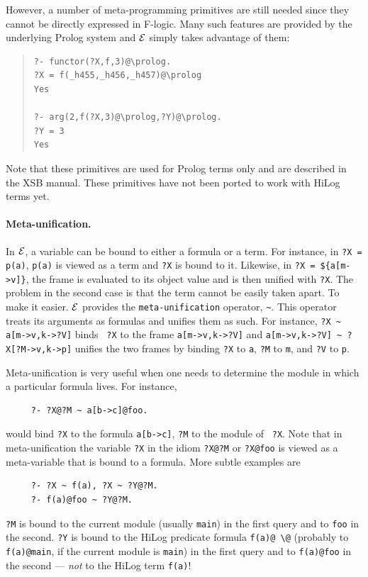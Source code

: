 \documentclass[11pt]{article}
\newcommand{\ERGO}{\mbox{\ensuremath{\cal{E}}\smaller{{\sc{RGO}}}}\xspace}
\newcommand{\FLSYSTEM}{\ERGO}
\newcommand{\bs}{\textbackslash}
\newcommand{\fl}{\mbox{F-logic}\xspace}
\begin{document}
However, a number of meta-programming primitives are still needed
since they cannot be directly expressed in \fl. Many such features are
provided by the underlying Prolog system and \FLSYSTEM simply takes advantage of
them: 
\begin{quote}
\begin{verbatim}
?- functor(?X,f,3)@\prolog.
?X = f(_h455,_h456,_h457)@\prolog
Yes

?- arg(2,f(?X,3)@\prolog,?Y)@\prolog.
?Y = 3
Yes
\end{verbatim}
\end{quote}
Note that these primitives are used for Prolog terms only and
are described in the XSB manual. These primitives have not been ported to
work with HiLog terms yet.

\paragraph{Meta-unification.}
In \FLSYSTEM, a variable can be bound to either a formula or a term. For instance,
in {\tt ?X = p(a)}, {\tt p(a)} is viewed as a term and {\tt ?X} is bound to
it. Likewise, in {\tt ?X = \$\{a[m->v]\}}, the frame is evaluated to its
object value and is then unified with {\tt ?X}.
The problem in the second case is that the term cannot be easily taken
apart.
To make it easier.
\FLSYSTEM provides the {\tt meta-unification}
operator, \verb|~|.  This operator treats its arguments as formulas and
unifies them as such. For instance, {\tt ?X \verb|~| a[m->v,k->?V]} binds {\tt
  ?X} to the frame {\tt a[m->v,k->?V]} and {\tt a[m->v,k->?V] \verb|~|
  ?X[?M->v,k->p]} unifies the two frames by binding {\tt ?X} to {\tt a},
{\tt ?M} to {\tt m}, and {\tt ?V} to {\tt p}.

Meta-unification is very useful when one needs to determine the module
in which a particular formula lives. For instance,
\begin{verbatim}
     ?- ?X@?M ~ a[b->c]@foo.  
\end{verbatim}
would bind {\tt ?X} to the formula {\tt a[b->c]},  {\tt ?M} to the module of {\tt
?X}. Note that in meta-unification the variable {\tt ?X} in the idiom
\verb|?X@?M| or \verb|?X@foo| is viewed as a meta-variable that is bound to
a formula.  More subtle examples are
\begin{verbatim}
     ?- ?X ~ f(a), ?X ~ ?Y@?M.  
     ?- f(a)@foo ~ ?Y@?M.
\end{verbatim}
{\tt ?M} is bound to the current module (usually \texttt{main})
in the first query and to {\tt foo} in the
second. {\tt ?Y} is bound to the
HiLog predicate
formula {\tt f(a)@\,\bs{}@} (probably to \texttt{f(a)@main}, if the current
module is \texttt{main})
in the first query and to {\tt f(a)@foo} in
the second --- \emph{not} to the HiLog term {\tt f(a)}!
\end{document}
